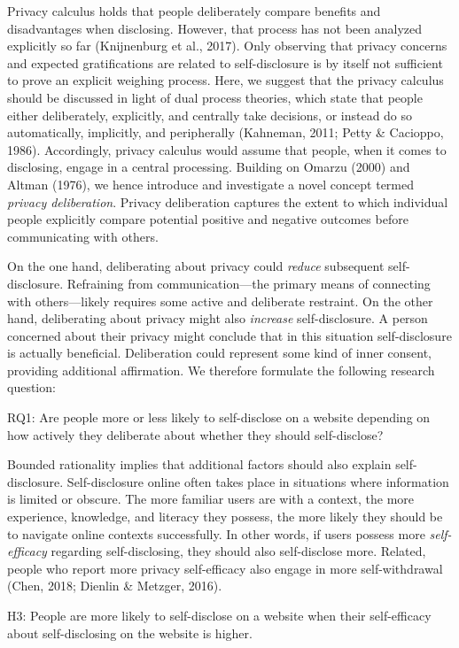 \documentclass[
  english,
  man,floatsintext]{apa6}
\begin{document}
Privacy calculus holds that people deliberately compare benefits and disadvantages when disclosing.
However, that process has not been analyzed explicitly so far (Knijnenburg et al., 2017).
Only observing that privacy concerns and expected gratifications are related to self-disclosure is by itself not sufficient to prove an explicit weighing process.
Here, we suggest that the privacy calculus should be discussed in light of dual process theories, which state that people either deliberately, explicitly, and centrally take decisions, or instead do so automatically, implicitly, and peripherally (Kahneman, 2011; Petty \& Cacioppo, 1986).
Accordingly, privacy calculus would assume that people, when it comes to disclosing, engage in a central processing.
Building on Omarzu (2000) and Altman (1976), we hence introduce and investigate a novel concept termed \emph{privacy deliberation}.
Privacy deliberation captures the extent to which individual people explicitly compare potential positive and negative outcomes before communicating with others.

On the one hand, deliberating about privacy could \emph{reduce} subsequent self-disclosure.
Refraining from communication---the primary means of connecting with others---likely requires some active and deliberate restraint.
On the other hand, deliberating about privacy might also \emph{increase} self-disclosure.
A person concerned about their privacy might conclude that in this situation self-disclosure is actually beneficial.
Deliberation could represent some kind of inner consent, providing additional affirmation.
We therefore formulate the following research question:

RQ1: Are people more or less likely to self-disclose on a website depending on how actively they deliberate about whether they should self-disclose?

Bounded rationality implies that additional factors should also explain self-disclosure.
Self-disclosure online often takes place in situations where information is limited or obscure.
The more familiar users are with a context, the more experience, knowledge, and literacy they possess, the more likely they should be to navigate online contexts successfully.
In other words, if users possess more \emph{self-efficacy} regarding self-disclosing, they should also self-disclose more.
Related, people who report more privacy self-efficacy also engage in more self-withdrawal (Chen, 2018; Dienlin \& Metzger, 2016).

H3: People are more likely to self-disclose on a website when their self-efficacy about self-disclosing on the website is higher.
\end{document}
